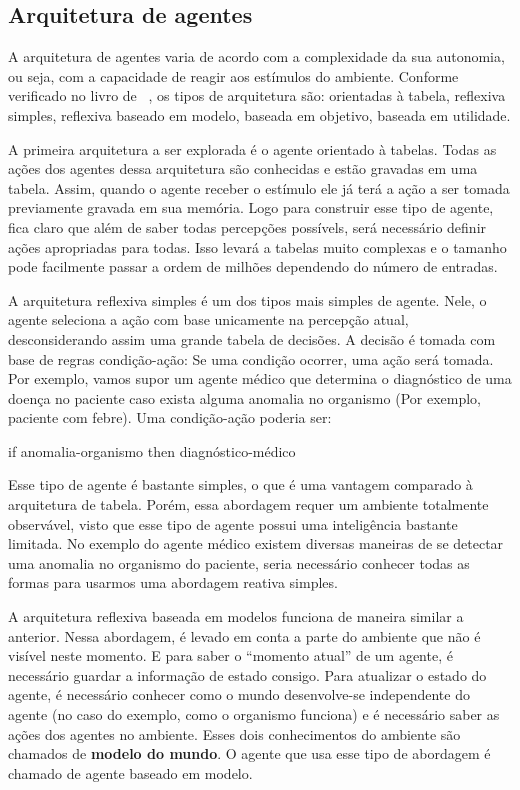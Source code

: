 \subsection{Arquitetura de agentes}

A arquitetura de agentes varia de acordo com a complexidade da sua autonomia, ou seja, com a capacidade de reagir aos estímulos do ambiente. Conforme verificado no livro de ~\cite{novig95}, os tipos de arquitetura são: orientadas à tabela, reflexiva simples, reflexiva baseado em modelo, baseada em objetivo, baseada em utilidade.

A primeira arquitetura a ser explorada é o agente orientado à tabelas. Todas as ações dos agentes dessa arquitetura são conhecidas e estão gravadas em uma tabela. Assim, quando o agente receber o estímulo ele já terá a ação a ser tomada previamente gravada em sua memória. Logo para construir esse tipo de agente, fica claro que além de saber todas percepções possívels, será necessário definir ações apropriadas para todas. Isso levará a tabelas muito complexas e o tamanho pode facilmente passar a ordem de milhões dependendo do número de entradas.

A arquitetura reflexiva simples é um dos tipos mais simples de agente. Nele, o agente seleciona a ação com base unicamente na percepção atual, desconsiderando assim uma grande tabela de decisões. A decisão é tomada com base de regras condição-ação: Se uma condição ocorrer, uma ação será tomada. Por exemplo, vamos supor um agente médico que determina o diagnóstico de uma doença no paciente caso exista alguma anomalia no organismo (Por exemplo, paciente com febre). Uma condição-ação poderia ser:

if anomalia-organismo then diagnóstico-médico

Esse tipo de agente é bastante simples, o que é uma vantagem comparado à arquitetura de tabela. Porém, essa abordagem requer um ambiente totalmente observável, visto que esse tipo de agente possui uma inteligência bastante limitada. No exemplo do agente médico existem diversas maneiras de se detectar uma anomalia no organismo do paciente, seria necessário conhecer todas as formas para usarmos uma abordagem reativa simples.

A arquitetura reflexiva baseada em modelos funciona de maneira similar a anterior. Nessa abordagem, é levado em conta a parte do ambiente que não é visível neste momento. E para saber o ``momento atual'' de um agente, é necessário guardar a informação de estado consigo. Para atualizar o estado do agente, é necessário conhecer como o mundo desenvolve-se independente do agente (no caso do exemplo, como o organismo funciona) e é necessário saber as ações dos agentes no ambiente. Esses dois conhecimentos do ambiente são chamados de \textbf{modelo do mundo}. O agente que usa esse tipo de abordagem é chamado de agente baseado em modelo.

